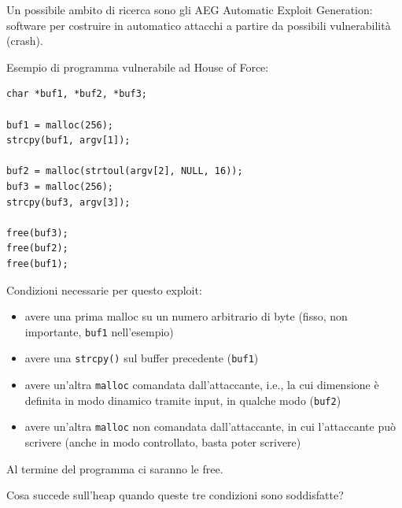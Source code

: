 Un possibile ambito di ricerca sono gli AEG Automatic Exploit Generation: software per costruire in automatico attacchi a partire da possibili vulnerabilità (crash).\\

\newpage

Esempio di programma vulnerabile ad House of Force:
\begin{verbatim}
char *buf1, *buf2, *buf3;

buf1 = malloc(256);
strcpy(buf1, argv[1]);

buf2 = malloc(strtoul(argv[2], NULL, 16));
buf3 = malloc(256);
strcpy(buf3, argv[3]);

free(buf3);
free(buf2);
free(buf1);
\end{verbatim}

Condizioni necessarie per questo exploit:
\begin{itemize}
	\item avere una prima malloc su un numero arbitrario di byte (fisso, non importante, \texttt{buf1} nell'esempio)
	\item avere una \texttt{strcpy()} sul buffer precedente (\texttt{buf1})
	\item avere un'altra \texttt{malloc} comandata dall'attaccante, i.e., la cui dimensione è definita in modo dinamico tramite input, in qualche modo (\texttt{buf2})
	\item avere un'altra \texttt{malloc} non comandata dall'attaccante, in cui l'attaccante può scrivere (anche in modo controllato, basta poter scrivere)
\end{itemize}
Al termine del programma ci saranno le free.\\

\newpage

Cosa succede sull'heap quando queste tre condizioni sono soddisfatte?

